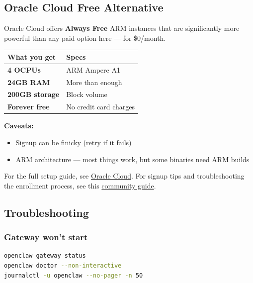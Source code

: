 \hrulefill


\subsection{Oracle Cloud Free Alternative}


Oracle Cloud offers \textbf{Always Free} ARM instances that are significantly more powerful than any paid option here — for \$0/month.


\begin{table}[h]
\centering
\small
\begin{tabular}{|l|l|}
\hline
What you get & Specs \\
\hline
\textbf{4 OCPUs} & ARM Ampere A1 \\
\hline
\textbf{24GB RAM} & More than enough \\
\hline
\textbf{200GB storage} & Block volume \\
\hline
\textbf{Forever free} & No credit card charges \\
\hline
\end{tabular}
\end{table}



\textbf{Caveats:}

\begin{itemize}
  \item Signup can be finicky (retry if it fails)
  \item ARM architecture — most things work, but some binaries need ARM builds
\end{itemize}


For the full setup guide, see \href{/platforms/oracle}{Oracle Cloud}. For signup tips and troubleshooting the enrollment process, see this \href{https://gist.github.com/rssnyder/51e3cfedd730e7dd5f4a816143b25dbd}{community guide}.

\hrulefill


\subsection{Troubleshooting}


\subsubsection{Gateway won't start}


\begin{lstlisting}[language=bash]
openclaw gateway status
openclaw doctor --non-interactive
journalctl -u openclaw --no-pager -n 50
\end{lstlisting}



